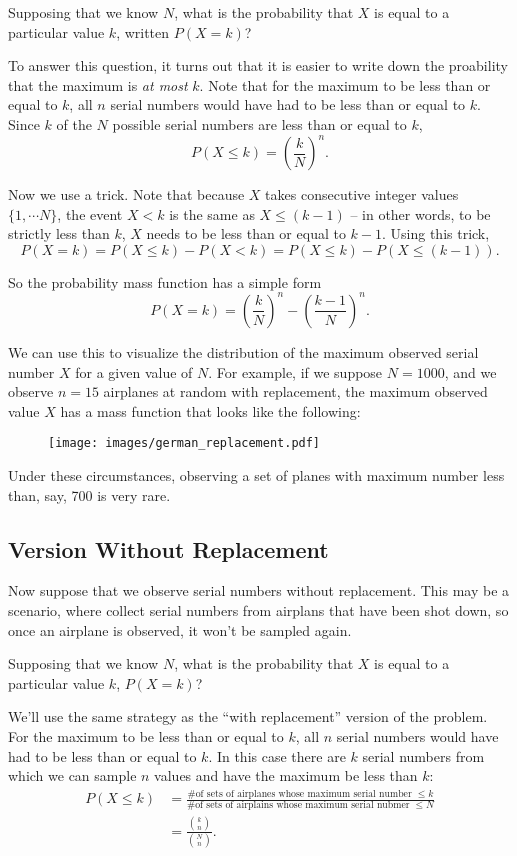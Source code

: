 \documentclass[11pt]{article}
\begin{document}
Supposing that we know $N$, what is the probability that $X$ is equal to a particular value $k$, written $P(X = k)$?

To answer this question, it turns out that it is easier to write down the proability that the maximum is \emph{at most} $k$.
Note that for the maximum to be less than or equal to $k$, all $n$ serial numbers would have had to be less than or equal to $k$.
Since $k$ of the $N$ possible serial numbers are less than or equal to $k$,
$$
P(X \leq k) = \left(\frac{k}{N}\right)^n.
$$

Now we use a trick. Note that because $X$ takes consecutive integer values $\{1, \cdots N\}$, the event $X < k$ is the same as
$X \leq (k-1)$ -- in other words, to be strictly less than $k$, $X$ needs to be less than or equal to $k-1$. Using this trick,
$$
P(X = k) = P(X \leq k) - P(X < k) = P(X \leq k) - P(X \leq (k-1)).
$$

So the probability mass function has a simple form
$$
P(X = k) = \left(\frac{k}{N}\right)^n - \left(\frac{k-1}{N}\right)^n.
$$

We can use this to visualize the distribution of the maximum observed serial number $X$ for a given value of $N$. For example,
if we suppose $N = 1000$, and we observe $n = 15$ airplanes at random with replacement, the maximum observed value $X$ has a
mass function that looks like the following:

\begin{figure}[h!]
    \centering
    \texttt{[image: images/german\_replacement.pdf]}
\end{figure}

Under these circumstances, observing a set of planes with maximum number less than, say, 700 is very rare.

\subsection*{Version Without Replacement}
Now suppose that we observe serial numbers without replacement. This may be a scenario,
where collect serial numbers from airplans that have been shot down, so once an airplane is observed,
it won't be sampled again.

Supposing that we know $N$, what is the probability that $X$ is equal to a particular value $k$, $P(X = k)$?

We'll use the same strategy as the ``with replacement'' version of the problem.
For the maximum to be less than or equal to $k$, all $n$ serial numbers would have had to be less than or equal to $k$.
In this case there are $k$ serial numbers from which we can sample $n$ values and have the maximum be less than $k$:
\begin{align*}
    P(X \leq k) &= \frac{\textrm{\# of sets of airplanes whose maximum serial number $\leq k$}}{\textrm{\# of sets of airplains whose maximum serial nubmer $\leq N$}}\\
                &= \frac{{k \choose n}}{{N \choose n}}
.
\end{align*}
\end{document}
